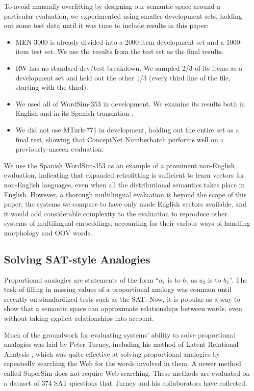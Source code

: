 \documentclass[letterpaper]{article}
\begin{document}
To avoid manually overfitting by designing our semantic space around a
particular evaluation, we experimented using smaller development sets, holding
out some test data until it was time to include results in this paper:

\begin{itemize}
\item
    MEN-3000 is already divided into a 2000-item development set and a
    1000-item test set. We use the results from the test set as the final results.
\item
    RW has no standard dev/test breakdown. We sampled 2/3 of its items as
    a development set and held out the other 1/3 (every third line of the file,
    starting with the third).
\item
    We used all of WordSim-353 in development. We examine its results both in
    English and in its Spanish translation \cite{hassan2009crosslingual}.
\item
    We did not use MTurk-771 in development, holding out the entire set
    as a final test, showing that ConceptNet Numberbatch performs well on a
    previously-unseen evaluation.
\end{itemize}

We use the Spanish WordSim-353 as an example of a prominent non-English evaluation,
indicating that expanded retrofitting is sufficient to learn vectors for
non-English languages, even when all the distributional semantics takes place in
English. However, a thorough multilingual evaluation is beyond the scope of
this paper; the systems we compare to have only made English vectors available,
and it would add considerable complexity to the evaluation to reproduce other
systems of multilingual embeddings, accounting for their various ways of
handling morphology and OOV words.


\subsection{Solving SAT-style Analogies}

Proportional analogies are statements of the form ``$a_1$ is to $b_1$ as $a_2$
is to $b_2$''. The task of filling in missing values of a proportional analogy
was common until recently on standardized tests such as the SAT. Now, it is
popular as a way to show that a semantic space can approximate relationships
between words, even without taking explicit relationships into account.

Much of the groundwork for evaluating systems' ability to solve proportional
analogies was laid by Peter Turney, including his method of Latent Relational
Analysis \cite{turney2006lra}, which was quite effective at solving
proportional analogies by repeatedly searching the Web for the words involved
in them. A newer method called SuperSim \cite{turney2013supersim} does
not require Web searching. These methods are evaluated on a dataset of 374 SAT
questions that Turney and his collaborators have collected.
\end{document}
